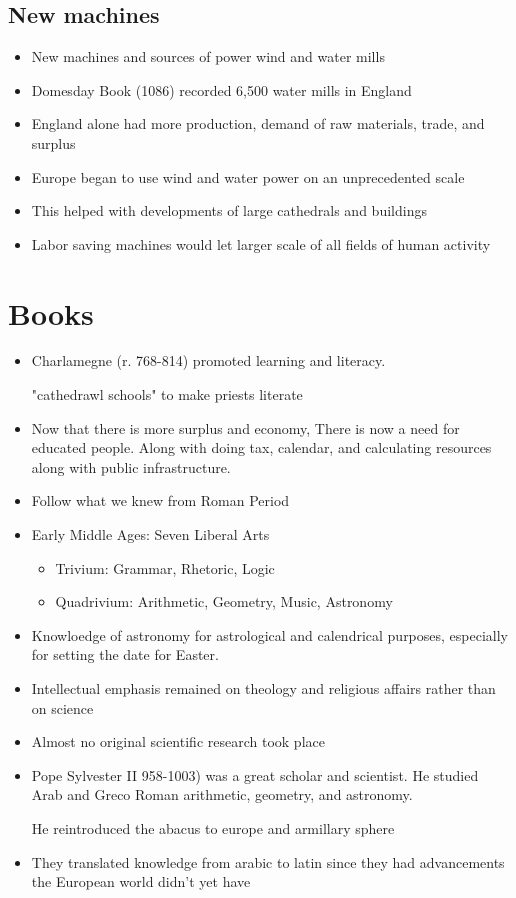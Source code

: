 \documentclass{article}
\begin{document}
\subsection{New machines}
\begin{itemize}
  \item New machines and sources of power
    \rightarrow{} wind and water mills
  \item Domesday Book (1086) recorded 6,500 water mills in England
  \item England alone had more production, demand of raw materials,
    trade, and surplus
  \item Europe began to use wind and water power on an unprecedented scale
  \item This helped with developments
    of large cathedrals and buildings
  \item Labor saving machines would let larger scale of all fields of human activity
\end{itemize}

\section{Books}
\begin{itemize}
  \item Charlamegne (r. 768-814) promoted learning and literacy.

    "cathedrawl schools" to make priests literate
  \item Now that there is more surplus and economy, There is now a need for
    educated people. Along with doing tax, calendar, and calculating
    resources along with public infrastructure.
  \item Follow what we knew from Roman Period
  \item Early Middle Ages: Seven Liberal Arts
    \begin{itemize}
      \item Trivium: Grammar, Rhetoric, Logic
      \item Quadrivium: Arithmetic, Geometry, Music, Astronomy
    \end{itemize}
  \item Knowloedge of astronomy for astrological and calendrical purposes,
    especially for setting the date for Easter.
  \item Intellectual emphasis remained on theology and religious affairs rather than on science
  \item Almost no original scientific research took place
  \item Pope Sylvester II 958-1003) was a great scholar and scientist.
    He studied Arab and Greco Roman arithmetic, geometry, and astronomy.

    He reintroduced the abacus to europe and armillary sphere
  \item They translated knowledge from arabic to latin since they had advancements
    the European world didn't yet have
\end{itemize}
\end{document}
